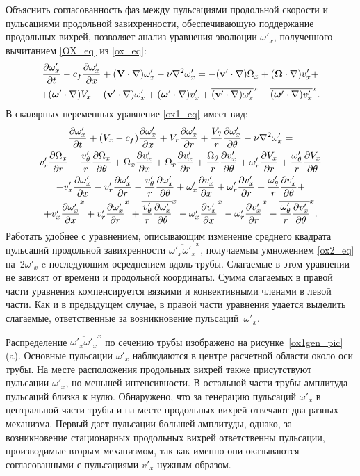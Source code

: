 Объяснить согласованность фаз между пульсациями продольной скорости и пульсациями продольной завихренности, обеспечивающую поддержание продольных вихрей, позволяет анализ уравнения эволюции $\omega'_x$, полученного вычитанием \eqref{OX_eq} из \eqref{ox_eq}:
\begin{multline}\label{ox1_eq}
\frac{\partial \omega'_x}{\partial t} - c_f\frac{\partial \omega'_x}{\partial x} + (\mathbf{V} \cdot \nabla) \omega'_x - \nu \nabla^2 \omega'_x = - (\mathbf{v}' \cdot \nabla) \Omega_x
+(\mbox{\boldmath$\Omega$} \cdot \nabla) v'_x + \\ + (\mbox{\boldmath$\omega$}' \cdot \nabla) V_x - (\mathbf{v}' \cdot \nabla) \omega'_x  + (\mbox{\boldmath$\omega$}' \cdot \nabla) v'_x  + \overline{(\mathbf{v}' \cdot \nabla) \omega'_x}^x  - \overline{(\mbox{\boldmath$\omega$}' \cdot \nabla)v'_x}^x.
\end{multline}
В скалярных переменных уравнение \eqref{ox1_eq} имеет вид:
\begin{multline}\label{ox2_eq}
\frac{\partial \omega'_x}{\partial t} + (V_x - c_f)\frac{\partial \omega'_x}{\partial x} + V_r \frac{\partial \omega_x'}{\partial r} + \frac{V_\theta}{r} \frac{\partial \omega'_x}{\partial \theta} 
- \nu\nabla^2\omega'_x = \\
- v'_r \frac{\partial \Omega_x}{\partial r} - \frac{v'_\theta}{r} \frac{\partial \Omega_x}{\partial \theta} 
+ \Omega_x \frac{\partial v'_x}{\partial x} + \Omega_r \frac{\partial v'_x}{\partial r} + \frac{\Omega_\theta}{r} \frac{\partial v'_x}{\partial \theta}
+ \omega'_r \frac{\partial V_x}{\partial r} + \frac{\omega'_\theta}{r} \frac{\partial V_x}{\partial \theta} - \\ 
- v'_x \frac{\partial \omega'_x}{\partial x} - v'_r \frac{\partial \omega'_x}{\partial r} - \frac{v'_\theta}{r} \frac{\partial \omega'_x}{\partial \theta} 
+ \omega'_x \frac{\partial v'_x}{\partial x} + \omega'_r \frac{\partial v'_x}{\partial r} + \frac{\omega'_\theta}{r} \frac{\partial v'_x}{\partial \theta} + \\
+ \overline{v'_x \frac{\partial \omega'_x}{\partial x}}^x + \overline{v'_r \frac{\partial \omega'_x}{\partial r}}^x + \overline{\frac{v'_\theta}{r} \frac{\partial \omega'_x}{\partial \theta}}^x
- \overline{\omega'_x \frac{\partial v'_x}{\partial x}}^x - \overline{\omega'_r \frac{\partial v'_x}{\partial r}}^x - \overline{\frac{\omega'_\theta}{r} \frac{\partial v'_x}{\partial \theta}}^x.
\end{multline}
Работать удобнее с уравнением, описывающим изменение среднего квадрата пульсаций продольной завихренности $\overline{\omega'_x\omega'_x}^x$, получаемым умножением \eqref{ox2_eq} на~$2\omega'_x$ c последующим осреднением вдоль трубы. Слагаемые в этом уравнении не зависят от времени и продольной координаты. Сумма слагаемых в правой части уравнения компенсируется вязкими и конвективными членами в левой части. Как и в предыдущем случае, в правой части уравнения удается выделить слагаемые, ответственные за возникновение пульсаций~$\omega'_x$. 


Распределение $\overline{\omega'_x \omega'_x}^x$ по сечению трубы изображено на рисунке~\ref{ox1gen_pic}(a). Основные пульсации $\omega'_x$ наблюдаются в центре расчетной области около оси трубы. На месте расположения продольных вихрей также присутствуют пульсации $\omega'_x$, но меньшей интенсивности. В остальной части трубы амплитуда пульсаций близка к нулю. Обнаружено, что за генерацию пульсаций $\omega'_x$ в центральной части трубы и на месте продольных вихрей отвечают два разных механизма. Первый дает пульсации большей амплитуды, однако, за возникновение стационарных продольных вихрей ответственны пульсации, производимые вторым механизмом, так как именно они оказываются согласованными с пульсациями $v'_x$ нужным образом.


